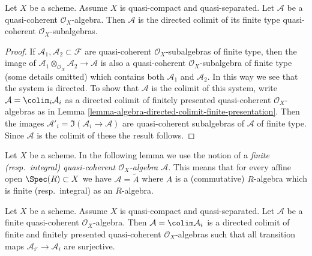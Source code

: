 \begin{lemma}
\label{lemma-algebra-directed-colimit-finite-type}
Let $X$ be a scheme. Assume $X$ is quasi-compact and quasi-separated.
Let $\mathcal{A}$ be a quasi-coherent $\mathcal{O}_X$-algebra.
Then $\mathcal{A}$ is the directed colimit of its finite type
quasi-coherent $\mathcal{O}_X$-subalgebras.
\end{lemma}

\begin{proof}
If $\mathcal{A}_1, \mathcal{A}_2 \subset \mathcal{F}$ are
quasi-coherent $\mathcal{O}_X$-subalgebras of finite type, then the image of
$\mathcal{A}_1 \otimes_{\mathcal{O}_X} \mathcal{A}_2 \to \mathcal{A}$
is also a quasi-coherent $\mathcal{O}_X$-subalgebra of finite type
(some details omitted) which contains both $\mathcal{A}_1$ and $\mathcal{A}_2$.
In this way we see that the system is directed.
To show that $\mathcal{A}$ is the colimit of this system, write
$\mathcal{A} = \colim_i \mathcal{A}_i$ as a directed
colimit of finitely presented quasi-coherent $\mathcal{O}_X$-algebras as in
Lemma \ref{lemma-algebra-directed-colimit-finite-presentation}.
Then the images $\mathcal{A}'_i = \Im(\mathcal{A}_i \to \mathcal{A})$ are
quasi-coherent subalgebras of $\mathcal{A}$ of finite type. Since
$\mathcal{A}$ is the colimit of these the result follows.
\end{proof}

\noindent
Let $X$ be a scheme. In the following lemma we use the notion
of a {\it finite (resp.\ integral) quasi-coherent
$\mathcal{O}_X$-algebra $\mathcal{A}$}. This means that for every
affine open $\Spec(R) \subset X$ we have
$\mathcal{A} = \widetilde{A}$ where $A$ is a (commutative) $R$-algebra
which is finite (resp.\ integral) as an $R$-algebra.

\begin{lemma}
\label{lemma-finite-algebra-directed-colimit-finite-finitely-presented}
Let $X$ be a scheme. Assume $X$ is quasi-compact and quasi-separated.
Let $\mathcal{A}$ be a finite quasi-coherent $\mathcal{O}_X$-algebra.
Then $\mathcal{A} = \colim \mathcal{A}_i$ is a directed colimit of finite
and finitely presented quasi-coherent $\mathcal{O}_X$-algebras
such that all transition maps $\mathcal{A}_{i'} \to \mathcal{A}_i$
are surjective.
\end{lemma}

